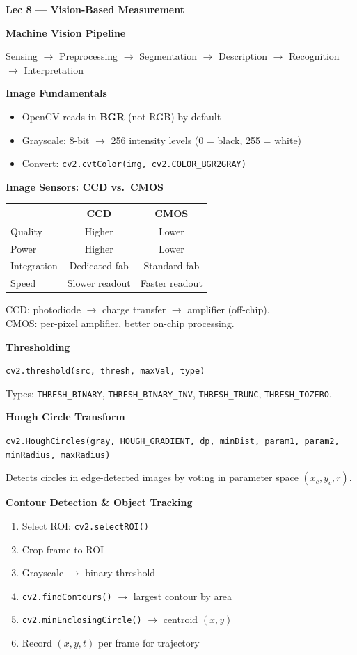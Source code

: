 \documentclass[9pt,twocolumn]{article}
\newcommand{\labsec}[1]{%
  \vspace{5pt}%
  \noindent\colorbox{accent}{\parbox{\dimexpr\columnwidth-2\fboxsep}{%
    \centering\bfseries\color{white}\small #1}}%
  \vspace{3pt}\par%
}
\newcommand{\subsec}[1]{%
  \vspace{3pt}%
  {\small\bfseries\textcolor{accent}{#1}}%
  \vspace{1pt}\par\noindent%
}
\begin{document}
\labsec{Lec 8 --- Vision-Based Measurement}

\subsec{Machine Vision Pipeline}
Sensing $\to$ Preprocessing $\to$ Segmentation $\to$ Description $\to$ Recognition $\to$ Interpretation

\subsec{Image Fundamentals}
\begin{itemize}
  \item OpenCV reads in \textbf{BGR} (not RGB) by default
  \item Grayscale: 8-bit $\to$ 256 intensity levels (0 = black, 255 = white)
  \item Convert: \texttt{cv2.cvtColor(img, cv2.COLOR\_BGR2GRAY)}
\end{itemize}

\subsec{Image Sensors: CCD vs.\ CMOS}
\begin{center}
\small
\begin{tabular}{lcc}
\toprule
 & CCD & CMOS\\
\midrule
Quality & Higher & Lower\\
Power & Higher & Lower\\
Integration & Dedicated fab & Standard fab\\
Speed & Slower readout & Faster readout\\
\bottomrule
\end{tabular}
\end{center}

CCD: photodiode $\to$ charge transfer $\to$ amplifier (off-chip).\\
CMOS: per-pixel amplifier, better on-chip processing.

\subsec{Thresholding}
\texttt{cv2.threshold(src, thresh, maxVal, type)}

Types: \texttt{THRESH\_BINARY}, \texttt{THRESH\_BINARY\_INV}, \texttt{THRESH\_TRUNC}, \texttt{THRESH\_TOZERO}.

\subsec{Hough Circle Transform}
\texttt{cv2.HoughCircles(gray, HOUGH\_GRADIENT, dp, minDist, param1, param2, minRadius, maxRadius)}

Detects circles in edge-detected images by voting in parameter space $(x_c, y_c, r)$.

\subsec{Contour Detection \& Object Tracking}
\begin{enumerate}
  \item Select ROI: \texttt{cv2.selectROI()}
  \item Crop frame to ROI
  \item Grayscale $\to$ binary threshold
  \item \texttt{cv2.findContours()} $\to$ largest contour by area
  \item \texttt{cv2.minEnclosingCircle()} $\to$ centroid $(x,y)$
  \item Record $(x, y, t)$ per frame for trajectory
\end{enumerate}
\end{document}
